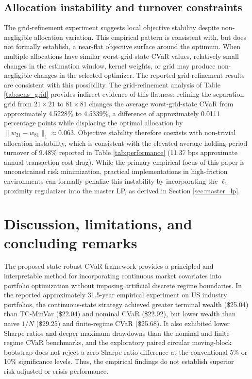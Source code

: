 \documentclass[smallextended]{svjour3}
\begin{document}
\subsection{Allocation instability and turnover constraints}
The grid-refinement experiment suggests local objective stability despite
non-negligible allocation variation. This empirical pattern is consistent
with, but does not formally establish, a near-flat objective surface around
the optimum. When multiple allocations have similar worst-grid-state CVaR values,
relatively small changes in the estimation window, kernel weights, or grid
may produce non-negligible changes in the selected optimizer. The reported
grid-refinement results are consistent with this possibility. The grid-refinement analysis of Table \ref{tab:sens_grid} provides indirect evidence of this flatness: refining the separation grid from $21\times21$ to $81\times81$ changes the
average worst-grid-state CVaR from approximately 4.5228\% to 4.5339\%, a
difference of approximately 0.0111 percentage points while displacing the optimal allocation by $\|w_{21}-w_{81}\|_1 \approx 0.063$. Objective stability therefore coexists with non-trivial allocation instability, which is consistent with the elevated average holding-period turnover of 9.48\% reported in Table \ref{tab:performance} (11.37 bps approximate annual transaction-cost drag). While the primary empirical focus of this paper is unconstrained risk minimization, practical implementations in high-friction environments can formally penalize this instability by incorporating the $\ell_1$ proximity regularizer into the master LP, as derived in Section \ref{sec:master_lp}.


\section{Discussion, limitations, and concluding remarks}
The proposed state-robust CVaR framework provides a principled and interpretable method for incorporating continuous market covariates into portfolio optimization without imposing artificial discrete regime boundaries. In the reported approximately 31.5-year empirical experiment on US industry portfolios, the continuous-state strategy achieved greater terminal wealth (\$25.04) than TC-MinVar (\$22.04) and nominal CVaR (\$22.92), but lower wealth than naive $1/N$ (\$29.25) and finite-regime CVaR (\$25.68). It also exhibited lower Sharpe ratios and deeper maximum drawdowns than the nominal and finite-regime CVaR benchmarks, and the exploratory paired circular moving-block bootstrap \cite{politis1992circular} does not reject a
zero Sharpe-ratio difference at the conventional 5\% or 10\% significance levels. Thus, the empirical findings do not establish superior risk-adjusted or crisis performance.
\end{document}
